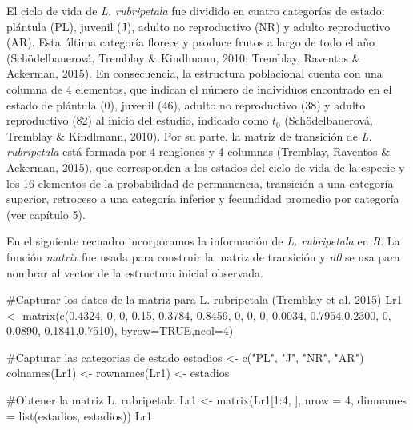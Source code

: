 \documentclass[
  12pt,
  letterpaper,
]{book}
\newenvironment{Shaded}{\begin{snugshade}}{\end{snugshade}}
\newcommand{\AttributeTok}[1]{\textcolor[rgb]{0.40,0.45,0.13}{#1}}
\newcommand{\CommentTok}[1]{\textcolor[rgb]{0.37,0.37,0.37}{#1}}
\newcommand{\ConstantTok}[1]{\textcolor[rgb]{0.56,0.35,0.01}{#1}}
\newcommand{\DecValTok}[1]{\textcolor[rgb]{0.68,0.00,0.00}{#1}}
\newcommand{\FloatTok}[1]{\textcolor[rgb]{0.68,0.00,0.00}{#1}}
\newcommand{\FunctionTok}[1]{\textcolor[rgb]{0.28,0.35,0.67}{#1}}
\newcommand{\NormalTok}[1]{\textcolor[rgb]{0.00,0.23,0.31}{#1}}
\newcommand{\OtherTok}[1]{\textcolor[rgb]{0.00,0.23,0.31}{#1}}
\newcommand{\SpecialCharTok}[1]{\textcolor[rgb]{0.37,0.37,0.37}{#1}}
\newcommand{\StringTok}[1]{\textcolor[rgb]{0.13,0.47,0.30}{#1}}
\begin{document}
El ciclo de vida de \emph{L. rubripetala} fue dividido en cuatro
categorías de estado: plántula (PL), juvenil (J), adulto no reproductivo
(NR) y adulto reproductivo (AR). Esta última categoría florece y produce
frutos a largo de todo el año (Schödelbauerová, Tremblay \& Kindlmann,
2010; Tremblay, Raventos \& Ackerman, 2015). En consecuencia, la
estructura poblacional cuenta con una columna de 4 elementos, que
indican el número de individuos encontrado en el estado de plántula (0),
juvenil (46), adulto no reproductivo (38) y adulto reproductivo (82) al
inicio del estudio, indicado como \(t_{0}\) (Schödelbauerová, Tremblay
\& Kindlmann, 2010). Por su parte, la matriz de transición de \emph{L.
rubripetala} está formada por 4 renglones y 4 columnas (Tremblay,
Raventos \& Ackerman, 2015), que corresponden a los estados del ciclo de
vida de la especie y los 16 elementos de la probabilidad de permanencia,
transición a una categoría superior, retroceso a una categoría inferior
y fecundidad promedio por categoría (ver capítulo 5).

En el siguiente recuadro incorporamos la información de \emph{L.
rubripetala} en \emph{R}. La función \emph{matrix} fue usada para
construir la matriz de transición y \emph{n0} se usa para nombrar al
vector de la estructura inicial observada.

\begin{Shaded}
\begin{Highlighting}[]
\CommentTok{\#Capturar los datos de la matriz para L. rubripetala (Tremblay et al. 2015)}
\NormalTok{Lr1 }\OtherTok{\textless{}{-}} \FunctionTok{matrix}\NormalTok{(}\FunctionTok{c}\NormalTok{(}\FloatTok{0.4324}\NormalTok{, }\DecValTok{0}\NormalTok{,      }\DecValTok{0}\NormalTok{,     }\FloatTok{0.15}\NormalTok{,}
               \FloatTok{0.3784}\NormalTok{, }\FloatTok{0.8459}\NormalTok{, }\DecValTok{0}\NormalTok{,     }\DecValTok{0}\NormalTok{,}
               \DecValTok{0}\NormalTok{,      }\FloatTok{0.0034}\NormalTok{, }\FloatTok{0.7954}\NormalTok{,}\FloatTok{0.2300}\NormalTok{,}
               \DecValTok{0}\NormalTok{,      }\FloatTok{0.0890}\NormalTok{, }\FloatTok{0.1841}\NormalTok{,}\FloatTok{0.7510}\NormalTok{), }
      \AttributeTok{byrow=}\ConstantTok{TRUE}\NormalTok{,}\AttributeTok{ncol=}\DecValTok{4}\NormalTok{)}

\CommentTok{\#Capturar las categorias de estado}
\NormalTok{estadios }\OtherTok{\textless{}{-}} \FunctionTok{c}\NormalTok{(}\StringTok{"PL"}\NormalTok{, }\StringTok{"J"}\NormalTok{, }\StringTok{"NR"}\NormalTok{, }\StringTok{"AR"}\NormalTok{)}
\FunctionTok{colnames}\NormalTok{(Lr1) }\OtherTok{\textless{}{-}} \FunctionTok{rownames}\NormalTok{(Lr1) }\OtherTok{\textless{}{-}}\NormalTok{ estadios}

\CommentTok{\#Obtener la matriz L. rubripetala}
\NormalTok{Lr1 }\OtherTok{\textless{}{-}} \FunctionTok{matrix}\NormalTok{(Lr1[}\DecValTok{1}\SpecialCharTok{:}\DecValTok{4}\NormalTok{, ], }\AttributeTok{nrow =} \DecValTok{4}\NormalTok{, }\AttributeTok{dimnames =} \FunctionTok{list}\NormalTok{(estadios, estadios))}
\NormalTok{Lr1}
\end{Highlighting}
\end{Shaded}
\end{document}
